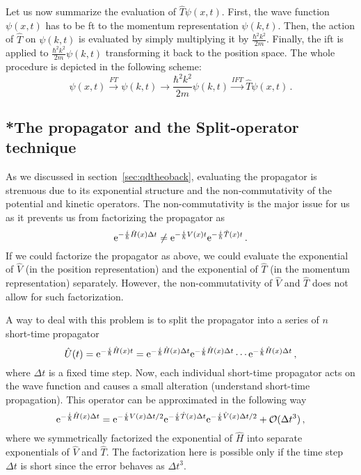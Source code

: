 Let us now summarize the evaluation of $\hat{T}\psi(x,t)$. First, the wave function $\psi(x,t)$ has to be \acrshort{ft} to the momentum representation $\psi(k,t)$. Then, the action of $\hat{T}$ on $\psi(k,t)$ is evaluated by simply multiplying it by $\frac{\hbar^2 k^2}{2m}$. Finally, the \acrshort{ift} is applied to $\frac{\hbar^2 k^2}{2m} \psi(k,t)$ transforming it back to the position space. The whole procedure is depicted in the following scheme:
\begin{equation}
    \psi(x,t) \stackrel{FT}{\longrightarrow} \psi(k,t) \longrightarrow \frac{\hbar^2 k^2}{2m} \psi(k,t) \stackrel{IFT}{\longrightarrow} \hat{T}\psi(x,t) \, .
\end{equation}

\subsection{*The propagator and the Split-operator technique}

As we discussed in section~\ref{sec:qdtheoback}, evaluating the propagator is strenuous due to its exponential structure and the non-commutativity of the potential and kinetic operators. The non-commutativity is the major issue for us as it prevents us from factorizing the propagator as
\begin{equation}
    \mathrm{e}^{-\frac{i}{\hbar}\hat{H}(x)\Delta t} \neq \mathrm{e}^{-\frac{i}{\hbar}V(x)t}\mathrm{e}^{-\frac{i}{\hbar}\hat{T}(x)t}\, .
\end{equation}
If we could factorize the propagator as above, we could evaluate the exponential of $\hat{V}$ (in the position representation) and the exponential of $\hat{T}$ (in the momentum representation) separately. However, the non-commutativity of $\hat{V}$ and $\hat{T}$ does not allow for such factorization.

A way to deal with this problem is to split the propagator into a series of $n$ short-time propagator
\begin{equation}
    \hat{U}(t) = \mathrm{e}^{-\frac{i}{\hbar}\hat{H}(x)t} = \mathrm{e}^{-\frac{i}{\hbar}\hat{H}(x)\Delta t} \mathrm{e}^{-\frac{i}{\hbar}\hat{H}(x)\Delta t} \cdots \mathrm{e}^{-\frac{i}{\hbar}\hat{H}(x)\Delta t} \, ,
    \label{eq:U4}
\end{equation}
where $\Delta t$ is a fixed time step. Now, each individual short-time propagator acts on the wave function and causes a small alteration (understand short-time propagation). This operator can be approximated in the following way
\begin{equation}
    \mathrm{e}^{-\frac{i}{\hbar}\hat{H}(x)\Delta t} = \mathrm{e}^{-\frac{i}{\hbar}V(x)\Delta t/2}\mathrm{e}^{-\frac{i}{\hbar}\hat{T}(x)\Delta t}\mathrm{e}^{-\frac{i}{\hbar}\hat{V}(x)\Delta t/2} + \mathcal{O}(\Delta t^3) \, ,
\end{equation}
where we symmetrically factorized the exponential of $\hat{H}$ into separate exponentials of $\hat{V}$ and $\hat{T}$. The factorization here is possible only if the time step $\Delta t$ is short since the error behaves as $\Delta t^3$. 

